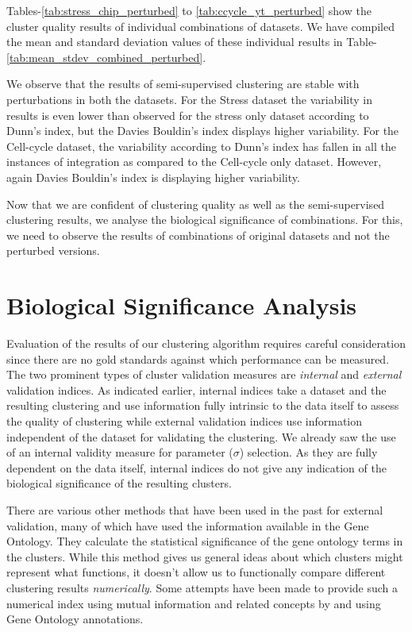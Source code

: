 Tables-\ref{tab:stress_chip_perturbed} to \ref{tab:ccycle_yt_perturbed} show the cluster quality results of individual combinations of datasets. We have compiled the mean 
and standard deviation values of these individual results in Table-\ref{tab:mean_stdev_combined_perturbed}. 

We observe that the results of semi-supervised clustering are stable with perturbations in both the datasets. For the Stress dataset the variability in results is even lower than
 observed for the stress only dataset according to Dunn's index, but the Davies Bouldin's index displays higher variability. For the Cell-cycle dataset, the variability according to Dunn's
 index has fallen in all the instances of integration as compared to the Cell-cycle only dataset. However, again Davies Bouldin's index is displaying higher variability.
  
Now that we are confident of clustering quality as well as the semi-supervised clustering results, 
we analyse the biological significance of combinations. For this, we need to observe the results of combinations of original datasets 
and not the perturbed versions. 

\section{Biological Significance Analysis}
Evaluation of the results of our clustering algorithm requires careful consideration since there are no gold standards against which performance can be measured. 
The two prominent types of cluster validation measures are \textit{internal} and \textit{external} validation indices. As indicated earlier, internal indices take a dataset and 
the resulting clustering and use information fully intrinsic to the data itself to assess the quality of clustering while external validation indices use information independent 
of the dataset for validating the clustering. We already saw the use of an internal validity measure for parameter ($\sigma$) selection. As they are fully dependent on the 
data itself, internal indices do not give any indication of the biological significance of the resulting clusters.  

There are various other methods that have been used in the past for external validation, many of which have used the information available in the Gene Ontology. 
They calculate the statistical significance of the gene ontology terms in the clusters. While this method gives us general ideas about which clusters might represent 
what functions, it doesn't allow us to functionally compare different clustering results \textit{numerically}. Some attempts have been made to provide 
such a numerical index using mutual information and related concepts by \citet{Gibons2002Judging} and \citet{gatviks03scoring} using Gene Ontology annotations. 

